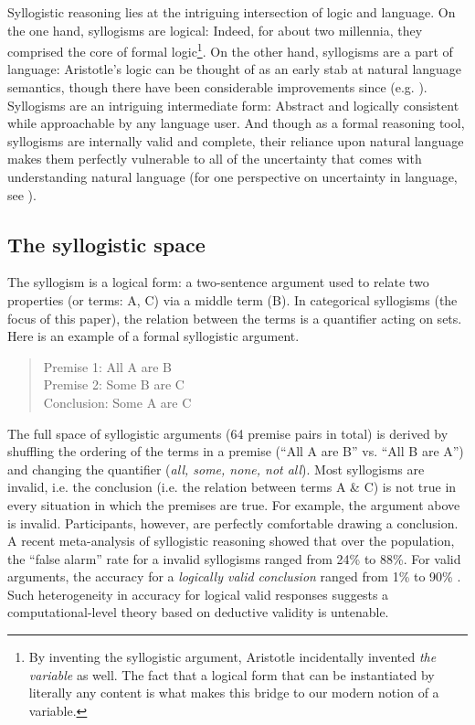 \documentclass{llncs} %
\begin{document}
Syllogistic reasoning lies at the intriguing intersection of logic and language. On the one hand, syllogisms are logical: Indeed, for about two millennia, they comprised the core of formal logic\footnote{By inventing the syllogistic argument, Aristotle incidentally invented \emph{the variable} as well. The fact that a logical form that can be instantiated by literally any content is what makes this bridge to our modern notion of a variable.}. On the other hand, syllogisms are a part of language: Aristotle's logic can be thought of as an early stab at natural language semantics, though there have been considerable improvements since (e.g. ). Syllogisms are an intriguing intermediate form: Abstract and logically consistent while approachable by any language user. And though as a formal reasoning tool, syllogisms are internally valid and complete, their reliance upon natural language makes them perfectly vulnerable to all of the uncertainty that comes with understanding natural language (for one perspective on uncertainty in language, see ).

\subsection{The syllogistic space}

The syllogism is a logical form: a two-sentence argument used to relate two properties (or terms: A, C) via a middle term (B). In categorical syllogisms (the focus of this paper), the relation between the terms is a quantifier acting on sets. Here is an example of a formal syllogistic argument.
\begin{quote}
Premise 1: All A are B\\
Premise 2: Some B are C\\
Conclusion: Some A are C
\end{quote}
The full space of syllogistic arguments (64 premise pairs in total) is derived by shuffling the ordering of the terms in a premise (``All A are B'' vs. ``All B are A'') and changing the quantifier (\emph{all, some, none, not all}). Most syllogisms are invalid, i.e. the conclusion (i.e. the relation between terms A \& C) is not true in every situation in which the premises are true. For example, the argument above is invalid. Participants, however, are perfectly comfortable drawing a conclusion. A recent meta-analysis of syllogistic reasoning showed that over the population, the ``false alarm'' rate for a invalid syllogisms ranged from 24\% to 88\%. For valid arguments, the accuracy for a \emph{logically valid conclusion} ranged from 1\% to 90\% \cite{Khemlani2012}. Such heterogeneity in accuracy for logical valid responses suggests a computational-level theory based on deductive validity is untenable. 
\end{document}

